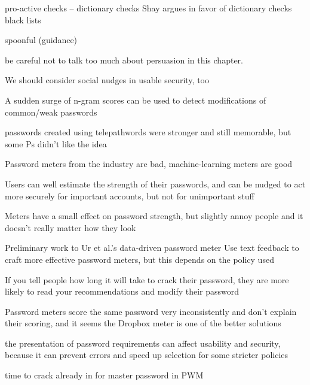 	
	pro-active checks -- dictionary checks Shay argues in favor of dictionary checks \cite{Shay2014CanLongPasswordsBeSecureAndUsable} 
	black lists \cite{Habib2017Blacklists} 
	
	spoonful (guidance) \cite{Shay2015SpoonfulOfSugar}
	\cite{Forget2008ImprovingPasswordsThroughPersuasion}
	
	be careful not to talk too much about persuasion in this chapter. 
	
	We should consider social nudges in usable security, too \cite{DiGioia2005SocialNavigationUsableSecurity}
	
	
	A sudden surge of n-gram scores can be used to detect modifications of common/weak passwords \cite{Tupsamudre2016MarkovStrength}
	
	
	passwords created using telepathwords were stronger and still memorable, but some Ps didn't like the idea \cite{Komanduri2014Telepathwords}
	
	Password meters from the industry are bad, machine-learning meters are good \cite{Wang2016fuzzyPWM}
	
	Users can well estimate the strength of their passwords, and can be nudged to act more securely for important accounts, but not for unimportant stuff \cite{Egelman2013DoesMyPasswordGoUpToEleven}
	
	Meters have a small effect on password strength, but slightly annoy people and it doesn't really matter how they look \cite{Ur2012HowDoesYourPasswordMeasureUp}
	
	Preliminary work to Ur et al.'s data-driven password meter \cite{Eargle2015YouCanDoBetter}
	Use text feedback to craft more effective password meters, but this depends on the policy used \cite{Ur2017DataDrivenPWMeter}
	
	If you tell people how long it will take to crack their password, they are more likely to read your recommendations and modify their password \cite{Vance2013FearAppeals}
	
	Password meters score the same password very inconsistently and don't explain their scoring, and it seems the Dropbox meter is one of the better solutions \cite{Carnavalet2014AnalyzingPWStrengthMeters}
	
	the presentation of password requirements can affect usability and security, because it can prevent errors and speed up selection for some stricter policies \cite{Shay2015SpoonfulOfSugar}
	
	time to crack already in \cite{Yee2006Passpet} for master password in PWM
	
